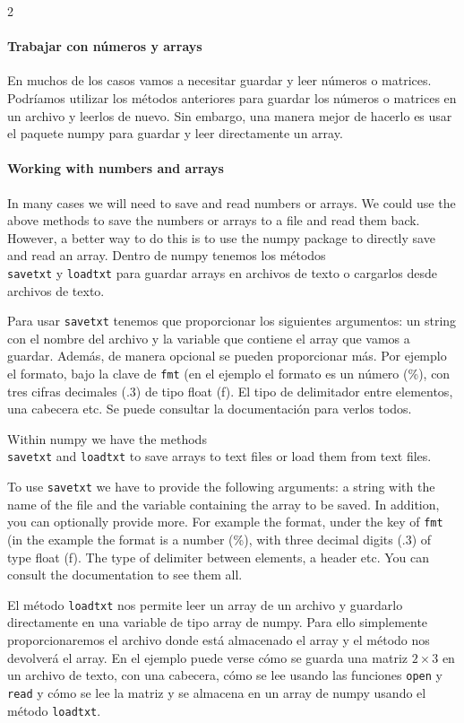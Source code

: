 \begin{paracol}{2}
\paragraph*{Trabajar con números y arrays}
 En muchos de los casos vamos a necesitar guardar y leer números o matrices. Podríamos utilizar los métodos anteriores para guardar los números o matrices en un archivo y leerlos de nuevo. Sin embargo, una manera mejor de hacerlo es usar el paquete numpy para guardar y leer directamente un array.
 \switchcolumn
 \paragraph*{Working with numbers and arrays}
 In many cases we will need to save and read numbers or arrays. We could use the above methods to save the numbers or arrays to a file and read them back. However, a better way to do this is to use the numpy package to directly save and read an array.
 \switchcolumn
 Dentro de numpy tenemos los métodos\\ \texttt{savetxt} y \texttt{loadtxt} para guardar arrays en archivos de texto o cargarlos desde archivos de texto. 

 Para usar \texttt{savetxt} tenemos que proporcionar los siguientes argumentos: un string con el nombre del archivo y la variable que contiene el array que vamos a guardar. Además, de manera opcional se pueden proporcionar más. Por ejemplo el formato, bajo la clave de \texttt{fmt} (en el ejemplo el formato es un número (\%), con tres cifras decimales ($.3$) de tipo float (f). El tipo de delimitador entre elementos, una cabecera etc. Se puede consultar la documentación para verlos todos.
 
 \switchcolumn

 Within numpy we have the methods\\ \texttt{savetxt} and \texttt{loadtxt} to save arrays to text files or load them from text files. 

 To use \texttt{savetxt} we have to provide the following arguments: a string with the name of the file and the variable containing the array to be saved. In addition, you can optionally provide more. For example the format, under the key of \texttt{fmt} (in the example the format is a number (\%), with three decimal digits ($.3$) of type float (f). The type of delimiter between elements, a header etc. You can consult the documentation to see them all.

 \switchcolumn
 El método \texttt{loadtxt} nos permite leer un array de un archivo y guardarlo directamente en una variable de tipo array de numpy. Para ello simplemente proporcionaremos el archivo donde está almacenado el array y el método nos devolverá el array. En el ejemplo puede verse cómo se guarda una matriz $2\times 3$ en un archivo de texto, con una cabecera, cómo se lee usando las funciones \texttt{open} y \texttt{read} y cómo se lee la matriz y se almacena en un array de numpy usando el método \texttt{loadtxt}.
 

\end{paracol}
